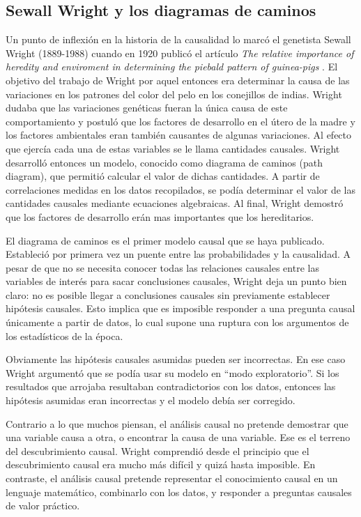 \begin{introduction}
	\subsection{Sewall Wright y los diagramas de caminos}
	Un punto de inflexión en la historia de la causalidad lo marcó el genetista Sewall Wright (1889-1988) cuando en 1920 publicó el artículo \textit{The relative importance of heredity and enviroment in determining the piebald pattern of guinea-pigs} \cite{wright1920relative}. El objetivo del trabajo de Wright por aquel entonces era determinar la causa de las variaciones en los patrones del color del pelo en los conejillos de indias. Wright dudaba que las variaciones genéticas fueran la única causa de este comportamiento y postuló que los factores de desarrollo en el útero de la madre y los factores ambientales eran también causantes de algunas variaciones. Al efecto que ejercía cada una de estas variables se le llama cantidades causales. Wright desarrolló entonces un modelo, conocido como diagrama de caminos (path diagram), que permitió calcular el valor de dichas cantidades. A partir de correlaciones medidas en los datos recopilados, se podía determinar el valor de las cantidades causales mediante ecuaciones algebraicas. Al final, Wright demostró que los factores de desarrollo erán mas importantes que los hereditarios. 
	
	El diagrama de caminos es el primer modelo causal que se haya publicado. Estableció por primera vez un puente entre las probabilidades y la causalidad.	A pesar de que no se necesita conocer todas las relaciones causales entre las variables de interés para sacar conclusiones causales, Wright deja un punto bien claro: no es posible llegar a conclusiones causales sin previamente establecer hipótesis causales. Esto implica que es imposible responder a una pregunta causal únicamente a partir de datos, lo cual supone una ruptura con los argumentos de los estadísticos de la época.
	
	Obviamente las hipótesis causales asumidas pueden ser incorrectas. En ese caso Wright argumentó que se podía usar su modelo en \textquotedblleft modo exploratorio\textquotedblright. Si los resultados que arrojaba resultaban contradictorios con los datos, entonces las hipótesis asumidas eran incorrectas y el modelo debía ser corregido.
	
	Contrario a lo que muchos piensan, el análisis causal no pretende demostrar que una variable causa a otra, o encontrar la causa de una variable. Ese es el terreno del descubrimiento causal. Wright comprendió desde el principio que el descubrimiento causal era mucho más difícil y quizá hasta imposible. En contraste, el análisis causal pretende representar el conocimiento causal en un lenguaje matemático, combinarlo con los datos, y responder a preguntas causales de valor práctico.\cite{PearlMackenzie18}		
	

\end{introduction}
